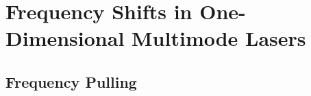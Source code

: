 %
%
%

 \section{Frequency Shifts in One-Dimensional Multimode Lasers\label{sct:laser_dynamics_1d_mml_frq}}

 \subsection{Frequency Pulling\label{sct:laser_dynamics_1d_mml_frq_frp}}

